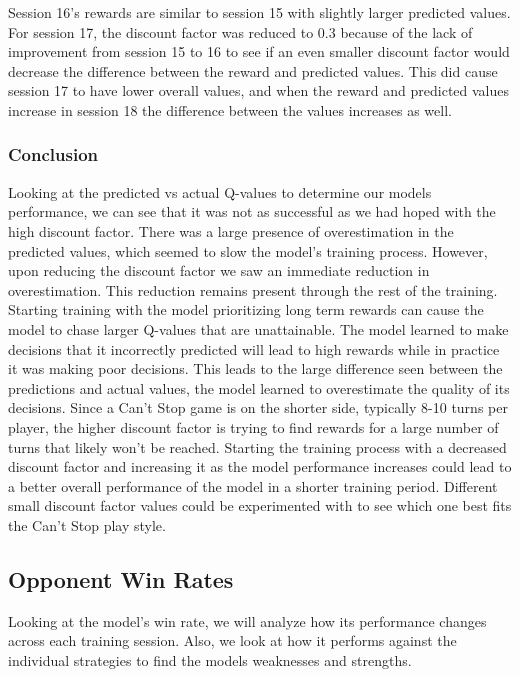 \documentclass[12pt]{article}
\begin{document}
\begin{thesis}
Session 16's rewards are similar to session 15 with slightly larger predicted values. For session 17, the discount factor was reduced to 0.3 because of the lack of improvement from session 15 to 16 to see if an even smaller discount factor would decrease the difference between the reward and predicted values. This did cause session 17 to have lower overall values, and when the reward and predicted values increase in session 18 the difference between the values increases as well.

\subsubsection{Conclusion}\label{conclusion}

Looking at the predicted vs actual Q-values to determine our models performance, we can see that it was not as successful as we had hoped with the high discount factor. There was a large presence of overestimation in the predicted values, which seemed to slow the model's training process. However, upon reducing the discount factor we saw an immediate reduction in overestimation. This reduction remains present through the rest of the training. Starting training with the model prioritizing long term rewards can cause the model to chase larger Q-values that are unattainable. The model learned to make decisions that it incorrectly predicted will lead to high rewards while in practice it was making poor decisions. This leads to the large difference seen between the predictions and actual values, the model learned to overestimate the quality of its decisions. Since a Can't Stop game is on the shorter side, typically 8-10 turns per player, the higher discount factor is trying to find rewards for a large number of turns that likely won't be reached.
Starting the training process with a decreased discount factor and increasing it as the model performance increases could lead to a better overall performance of the model in a shorter training period. Different small discount factor values could be experimented with to see which one best fits the Can't Stop play style.

\subsection{Opponent Win Rates}\label{opponent-win-rates}

Looking at the model's win rate, we will analyze how its performance changes across each training session. Also, we look at how it performs against the individual strategies to find the models weaknesses and strengths.


\end{thesis}
\end{document}
